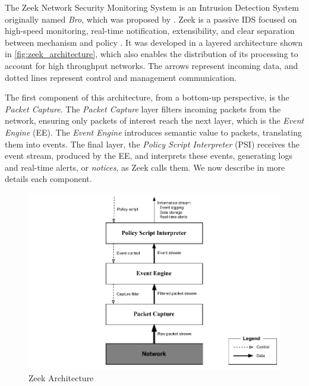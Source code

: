 The Zeek Network Security Monitoring System is an Intrusion Detection System originally named \textit{Bro}, which was proposed by . Zeek is a passive IDS focused on high-speed monitoring, real-time notification, extensibility, and clear separation between mechanism and policy \cite{Paxson1999}. It was developed in a layered architecture shown in \autoref{fig:zeek_architecture}, which also enables the distribution of its processing to account for high throughput networks. The arrows represent incoming data, and dotted lines represent control and management communication.

The first component of this architecture, from a bottom-up perspective, is the \textit{Packet Capture}. The \textit{Packet Capture} layer filters incoming packets from the network, ensuring only packets of interest reach the next layer, which is the \textit{Event Engine} (EE). The \textit{Event Engine} introduces semantic value to packets, translating them into events. The final layer, the \textit{Policy Script Interpreter} (PSI) receives the event stream, produced by the EE, and interprets these events, generating logs and real-time alerts, or \textit{notices}, as Zeek calls them. We now describe in more details each component.

\begin{figure}[htb]
    \caption{Zeek Architecture}
    \begin{center}
        \includegraphics[width=1.0\textwidth]{images/zeek-architecture.pdf}
    \end{center}
    \label{fig:zeek_architecture}
\end{figure}

